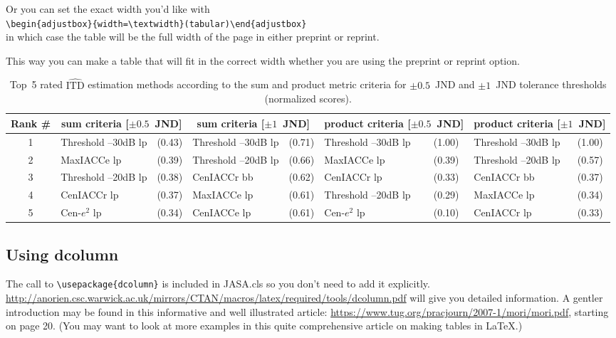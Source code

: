 \documentclass[preprint]{JASA}
\begin{document}
Or you can set the exact width you'd like with\\
\verb+\begin{adjustbox}{width=\textwidth}(tabular)\end{adjustbox}+\\
in which case the table will be the full width of the page in
either preprint or reprint.

This way you can make a table that will fit in the correct width
whether you are using the preprint or reprint option.

\begin{table}[b]
\caption{Top~5 rated $\widehat{\textrm{ITD}}$ estimation methods
according to the sum and product metric criteria for $\pm0.5$~JND and
$\pm1$~JND tolerance thresholds (normalized scores).}

\begin{adjustbox}{width=\textwidth}
\begin{tabular}{c| l l| l l| l l| l l}
\hline\hline
Rank \#& \multicolumn{2}{c}{sum criteria [$\pm0.5$~JND]} &
\multicolumn{2}{|c}{sum criteria [$\pm1$~JND]} &
\multicolumn{2}{|c}{product criteria [$\pm0.5$~JND]} & \multicolumn{2}{|c}{product criteria [$\pm1$~JND]}\\ 
\hline
1 & Threshold --30dB {lp} & (0.43) & Threshold --30dB {lp} & (0.71) & Threshold --30dB {lp} & (1.00) & Threshold --30dB {lp} & (1.00) \\ 
2 & MaxIACCe {lp} & (0.39) & Threshold --20dB {lp} & (0.66) & MaxIACCe {lp} & (0.39) & Threshold --20dB {lp} & (0.57) \\ 
3 & Threshold --20dB {lp} & (0.38) & CenIACCr {bb} &(0.62) & CenIACCr {lp} &(0.33) & CenIACCr {bb} & (0.37) \\ 
4 & CenIACCr {lp} &(0.37) & MaxIACCe {lp} & (0.61) & Threshold --20dB {lp} & (0.29) & MaxIACCe {lp} & (0.34) \\ 
5 & Cen-$e^2$ {lp} &(0.34) & CenIACCe {lp} & (0.61) & Cen-$e^2$ {lp}
& (0.10) & CenIACCr {lp} & (0.33) \\
\hline\hline
\end{tabular}
\end{adjustbox}

\label{tab:topMethods} 
\end{table}



\clearpage


\subsection{Using dcolumn}
The call to \verb+\usepackage{dcolumn}+ is included in JASA.cls so you
don't need to add it explicitly.
\href{http://anorien.csc.warwick.ac.uk/mirrors/CTAN/macros/latex/required/tools/dcolumn.pdf}
{\url{http://anorien.csc.warwick.ac.uk/mirrors/CTAN/macros/latex/required/tools/dcolumn.pdf}}
will give you detailed information.
A gentler introduction may be found in this informative and well
illustrated
article: \href{https://www.tug.org/pracjourn/2007-1/mori/mori.pdf}
{\url{https://www.tug.org/pracjourn/2007-1/mori/mori.pdf}}, starting on page
20. (You may want to look at more examples in this quite comprehensive
article on making tables in \LaTeX.)
\end{document}

